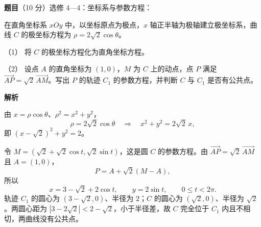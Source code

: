 \begin{answer}

\textbf{题目}（10 分）选修 4—4：坐标系与参数方程：

在直角坐标系 $xOy$ 中，以坐标原点为极点，$x$ 轴正半轴为极轴建立极坐标系，曲线 $C$ 的极坐标方程为 $\rho=2\sqrt2\cos\theta$。

（1） 将 $C$ 的极坐标方程化为直角坐标方程。

（2） 设点 $A$ 的直角坐标为 $(1,0)$，$M$ 为 $C$ 上的动点，点 $P$ 满足 $\overrightarrow{AP}=\sqrt2\,\overrightarrow{AM}$。写出 $P$ 的轨迹 $C_1$ 的参数方程，并判断 $C$ 与 $C_1$ 是否有公共点。

\textbf{解析}


由 $x=\rho\cos\theta$、$\rho^2=x^2+y^2$，
\nopagebreak[4]
\[
\rho=2\sqrt2\cos\theta
\quad\Longrightarrow\quad
x^2+y^2=2\sqrt2\,x,
\]
即 $(x-\sqrt2)^2+y^2=2$。


令 $M=(\sqrt2+\sqrt2\cos t,\sqrt2\sin t)$，这是圆 $C$ 的参数方程。由 $\overrightarrow{AP}=\sqrt2\,\overrightarrow{AM}$ 且 $A=(1,0)$，
\nopagebreak[4]
\[
P=A+\sqrt2(M-A),
\]
所以
\nopagebreak[4]
\[
x=3-\sqrt2+2\cos t,\qquad y=2\sin t,\qquad 0\leqslant t<2\pi.
\]
轨迹 $C_1$ 的圆心为 $(3-\sqrt2,0)$、半径为 $2$；$C$ 的圆心为 $(\sqrt2,0)$、半径为 $\sqrt2$。两圆心距为 $|3-2\sqrt2|<2-\sqrt2$，小于半径差，故 $C$ 完全位于 $C_1$ 内且不相切，两曲线没有公共点。


\gkanswer{答案（2）：$C_1$ 的参数方程为 $\begin{cases}x=3-\sqrt2+2\cos t,\\y=2\sin t,\end{cases}\ t\in[0,2\pi)$；$C$ 与 $C_1$ 无公共点。}

\end{answer}
